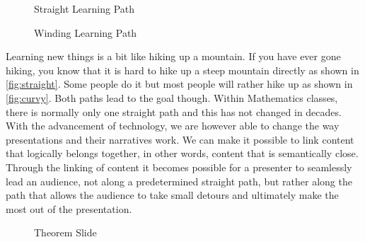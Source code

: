 \documentclass{llncs}
\begin{document}
\begin{figure}
\vspace{-2em}\centering
      \vspace{-20pt}
    \caption{Straight Learning Path}\label{fig:straight}
    \vspace{5pt}  
      \vspace{-20pt}
      \caption{Winding Learning Path}\label{fig:curvy}
      \vspace{-10pt}
\end{figure}

Learning new things is a bit like hiking up a mountain. If you have ever gone hiking, you know that it is hard to hike up a steep mountain directly as shown in \autoref{fig:straight}. Some people do it but most people will rather hike up as shown in \autoref{fig:curvy}. Both paths lead to the goal though. Within Mathematics classes, there is normally only one straight path and this has not changed in decades. With the advancement of technology, we are however able to change the way presentations and their narratives work. We can make it possible to link content that logically belongs together, in other words, content that is semantically close. Through the linking of content it becomes possible for a presenter to seamlessly lead an audience, not along a predetermined straight path, but rather along the path that allows the audience to take small detours and ultimately make the most out of the presentation.

\begin{figure}\centering\vspace{-2em}
  \vspace{-.5em}
  \caption{Theorem Slide}\label{fig:slideP}
  \vspace{-15pt}
\end{figure}
\end{document}

